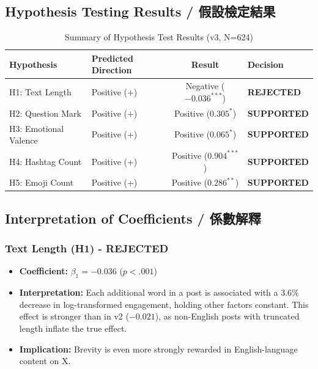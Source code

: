 \documentclass[12pt,a4paper]{article}
\begin{document}
\subsection{Hypothesis Testing Results / 假設檢定結果}

\begin{table}[H]
\centering
\caption{Summary of Hypothesis Test Results (v3, N=624)}
\small
\begin{tabular}{llcl}
\toprule
Hypothesis & Predicted Direction & Result & Decision \\
\midrule
H1: Text Length & Positive (+) & Negative ($-0.036^{***}$) & \textbf{REJECTED} \\
H2: Question Mark & Positive (+) & Positive ($0.305^{*}$) & \textbf{SUPPORTED} \\
H3: Emotional Valence & Positive (+) & Positive ($0.065^{*}$) & \textbf{SUPPORTED} \\
H4: Hashtag Count & Positive (+) & Positive ($0.904^{***}$) & \textbf{SUPPORTED} \\
H5: Emoji Count & Positive (+) & Positive ($0.286^{**}$) & \textbf{SUPPORTED} \\
\bottomrule
\end{tabular}
\end{table}

\subsection{Interpretation of Coefficients / 係數解釋}

\subsubsection{Text Length (H1) - REJECTED}
\begin{itemize}
    \item \textbf{Coefficient:} $\beta_1 = -0.036$ ($p < .001$)
    \item \textbf{Interpretation:} Each additional word in a post is associated with a 3.6\% decrease in log-transformed engagement, holding other factors constant. This effect is stronger than in v2 ($-0.021$), as non-English posts with truncated length inflate the true effect.
    \item \textbf{Implication:} Brevity is even more strongly rewarded in English-language content on X.
\end{itemize}
\end{document}
